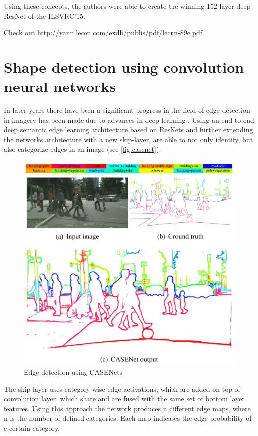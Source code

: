 Using these concepts, the authors were able to create the winning 152-layer deep ResNet of the ILSVRC'15.

Check out
http://yann.lecon.com/exdb/publis/pdf/lecun-89e.pdf

\section{Shape detection using convolution neural networks}
In later years there have been a significant progress in the field of edge detection in imagery has been made due to advances in deep learning \citep{Yu2017}. Using an end to end deep semantic edge learning architecture based on ResNets \citep{Wu2017} and further extending the networks architecture with a new skip-layer, \cite{Yu2017} are able to not only identify, but also categorize edges in an image (see \autoref{fig:casenet}).

\begin{figure}[!h]
	\centering
	\includegraphics[scale=0.4]{fig/casenet_edge_detection.png}
	\caption{Edge detection using CASENets \citep{Yu2017}}
	\label{fig:casenet}
\end{figure}

The skip-layer uses category-wise edge activations, which are added on top of convolution layer, which share and are fused with the same set of bottom layer features. Using this approach the network produces n different edge maps, where n is the number of defined categories. Each map indicates the edge probability of e certain category.

